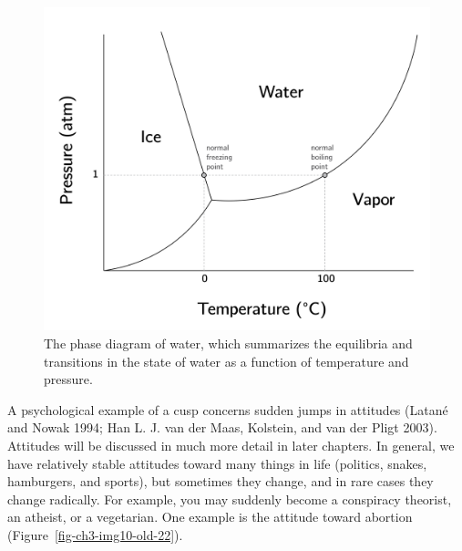 \documentclass[
  a4paper,
  DIV=11,
  numbers=noendperiod,
  oneside]{scrreprt}
\begin{document}
\begin{figure}

{\centering \includegraphics{media/ch3/ch3-12__figure24.png}

}

\caption{\label{fig-ch3-img12-old-24}The phase diagram of water, which
summarizes the equilibria and transitions in the state of water as a
function of temperature and pressure.}

\end{figure}

A psychological example of a cusp concerns sudden jumps in attitudes
(Latané and Nowak 1994; Han L. J. van der Maas, Kolstein, and van der
Pligt 2003). Attitudes will be discussed in much more detail in later
chapters. In general, we have relatively stable attitudes toward many
things in life (politics, snakes, hamburgers, and sports), but sometimes
they change, and in rare cases they change radically. For example, you
may suddenly become a conspiracy theorist, an atheist, or a vegetarian.
One example is the attitude toward abortion
(Figure~\ref{fig-ch3-img10-old-22}).
\end{document}
